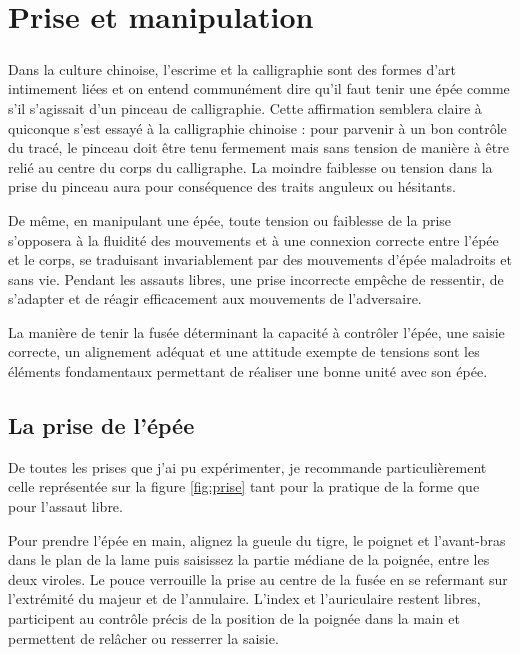 \chapter{Prise et manipulation}\label{ch:prise}

\paragraph*{}
Dans la culture chinoise, l'escrime et la calligraphie sont des formes d'art intimement liées et on entend communément dire qu'il faut tenir une épée comme s'il s'agissait d'un pinceau de calligraphie.
Cette affirmation semblera claire à quiconque s'est essayé à la calligraphie chinoise : pour parvenir à un bon contrôle du tracé, le pinceau doit être tenu fermement mais sans tension de manière à être relié au centre du corps du calligraphe.
La moindre faiblesse ou tension dans la prise du pinceau aura pour conséquence des traits anguleux ou hésitants.

De même, en manipulant une épée, toute tension ou faiblesse de la prise s'opposera à la fluidité des mouvements et à une connexion correcte entre l'épée et le corps, se traduisant invariablement par des mouvements d'épée maladroits et sans vie.
Pendant les assauts libres, une prise incorrecte empêche de ressentir, de s'adapter et de réagir efficacement aux mouvements de l'adversaire.

La manière de tenir la fusée déterminant la capacité à contrôler l'épée, une saisie correcte, un alignement adéquat et une attitude exempte de tensions sont les éléments fondamentaux permettant de réaliser une bonne unité avec son épée.

\section{La prise de l'épée}
De toutes les prises que j'ai pu expérimenter, je recommande particulièrement celle représentée sur la  figure \ref{fig:prise} tant pour la pratique de la forme que pour l'assaut libre.

Pour prendre l'épée en main, alignez la gueule du tigre, le poignet et l'avant-bras dans le plan de la lame puis saisissez la partie médiane de la poignée, entre les deux viroles.
Le pouce verrouille la prise au centre de la fusée en se refermant sur l'extrémité du majeur et de l'annulaire.
L'index et l'auriculaire restent libres, participent au contrôle précis de la position de la poignée dans la main et permettent de relâcher ou resserrer la saisie.

